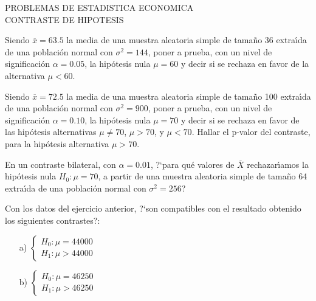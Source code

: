 
\begin{center}
    {\Large PROBLEMAS DE ESTADISTICA ECONOMICA}  \\
    \vspace{0.3cm}
    {\Large CONTRASTE DE HIPOTESIS}
\end{center}


\begin{prob}%
    Siendo $\overline{x} = 63.5$ la media de una muestra aleatoria simple de
    tama\~{n}o 36 extra\'{\i}da de una poblaci\'{o}n normal con
    $\sigma^2 = 144$, poner a prueba, con un nivel de significaci\'{o}n
    $\alpha = 0.05$, la hip\'{o}tesis nula $\mu = 60$ y decir si se rechaza
    en favor de la alternativa $\mu < 60$.
\end{prob}

\begin{prob}%
    Siendo $\overline{x}=72.5$ la media de una muestra aleatoria simple de
    tama\~{n}o 100 extra\'{\i}da de una poblaci\'on normal con
    $\sigma^2 = 900$, poner a prueba, con un nivel de significaci\'{o}n
    $\alpha = 0.10$, la hip\'{o}tesis nula $\mu = 70$ y decir si se rechaza
    en favor de las hip\'{o}tesis alternativas $\mu \not = 70$, $ \mu > 70$,
    y $\mu < 70$. Hallar el p-valor del contraste, para la hip\'otesis
    alternativa $ \mu > 70$.
\end{prob}

\begin{prob}%
    En un contraste bilateral, con $\alpha = 0.01$, ?`para qu\'{e} valores
    de $\overline{X}$ re\-cha\-zar\'{\i}amos la hip\'{o}tesis nula
    $H_{0}: \mu = 70$, a partir de una muestra aleatoria simple de
    tama\~{n}o 64 extra\'{\i}da de una poblaci\'{o}n normal con
    $\sigma^2 = 256$?
\end{prob}

\begin{prob}%
    Con los datos del ejercicio anterior, ?`son compatibles con el
    resultado obtenido los siguientes contrastes?:
    \begin{itemize}
    \item [a)] $\left\{
    \begin{array}{ll}
        H_{0}: \mu = 44000    \\
        H_{1}: \mu > 44000
    \end{array}
    \right.$

    \item [b)] $\left\{
    \begin{array}{ll}
        H_{0}: \mu = 46250     \\
        H_{1}: \mu > 46250
    \end{array}
    \right.$
    \end{itemize}
\end{prob}

